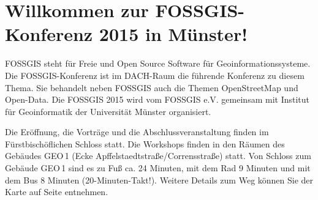 \newpage
\section*{Willkommen zur FOSSGIS-Konferenz 2015 in Münster!} \label{welcome}
FOSSGIS steht für Freie und Open Source Software für Geoinformationssysteme. 
Die FOSSGIS-Konferenz ist im DACH-Raum die führende Konferenz zu diesem Thema. Sie behandelt neben
FOSSGIS auch die Themen OpenStreetMap und Open-Data.
Die FOSSGIS 2015 wird vom FOSSGIS e.V. gemeinsam mit Institut für Geoinformatik der 
Universität Münster organisiert.

Die Eröffnung, die Vorträge und die Abschlussveranstaltung finden im Fürstbischöflichen Schloss statt. 
Die Workshops finden in den Räumen des Gebäudes GEO\,1 (Ecke Apffelstaedtstraße/Corrensstraße) statt. Von Schloss 
zum Gebäude GEO\,1 sind es zu Fuß ca. 24 Minuten, mit dem Rad 9 Minuten und mit dem Bus 8 Minuten (20-Minuten-Takt!).
Weitere Details zum Weg können Sie der Karte auf Seite  entnehmen.

\newpage
